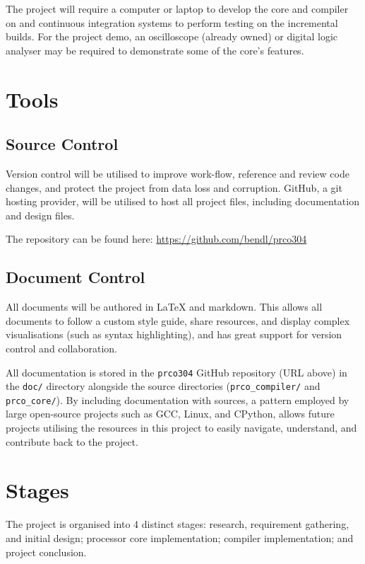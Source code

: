 \documentclass[11pt,a4paper]{report}
\begin{document}
The project will require a computer or laptop to develop the core and compiler on and continuous integration systems to perform testing on the incremental builds. For the project demo, an oscilloscope (already owned) or digital logic analyser may be required to demonstrate some of the core's features.

\section{Tools}

\subsection{Source Control}
Version control will be utilised to improve work-flow, reference and review code changes, and protect the project from data loss and corruption. GitHub, a git hosting provider, will be utilised to host all project files, including documentation and design files. 

The repository can be found here: \href{https://github.com/bendl/prco304}{https://github.com/bendl/prco304}

\subsection{Document Control}
All documents will be authored in LaTeX and markdown. This allows all documents to follow a custom style guide, share resources, and display complex visualisations (such as syntax highlighting), and has great support for version control and collaboration.

All documentation is stored in the \verb|prco304| GitHub repository (URL above) in the \verb|doc/| directory alongside the source directories (\verb|prco_compiler/| and \verb|prco_core/|). By including documentation with sources, a pattern employed by large open-source projects such as GCC, Linux, and CPython, allows future projects utilising the resources in this project to easily navigate, understand, and contribute back to the project.

\section{Stages}
The project is organised into 4 distinct stages: research, requirement gathering, and initial design; processor core implementation; compiler implementation; and project conclusion.
\end{document}
